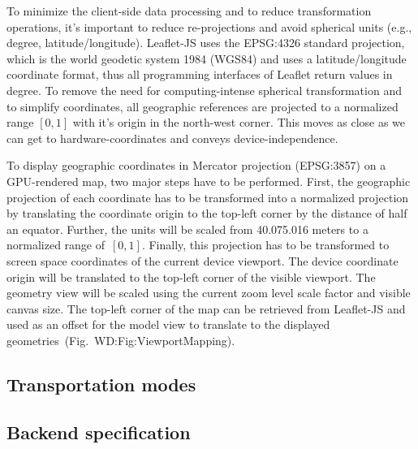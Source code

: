       To minimize the client-side data processing and to reduce transformation operations,
      it's important to reduce re-projections and avoid spherical units (e.g., degree,
      latitude/longitude). Leaflet-JS uses the EPSG:4326 standard projection, which is
      the world geodetic system 1984 (WGS84) and uses a latitude/longitude coordinate
      format, thus all programming interfaces of Leaflet return values in degree.
      To remove the need for computing-intense spherical transformation and to simplify
      coordinates, all geographic references are projected to a normalized range $[0, 1]$
      with it's origin in the north-west corner. This moves as close as we can get to
      hardware-coordinates and conveys device-independence.\par
      To dis\-play geographic coordinates in Mercator projection (EPSG:3857) on a GPU-rendered
      map, two major steps have to be performed. First, the geographic projection of
      each coordinate has to be transformed into a normalized projection by translating
      the coordinate origin to the top-left corner by the distance of half an equator.
      Further, the units will be scaled from 40.075.016 meters to a normalized range
      of~$[0,1]$. Finally, this projection has to be transformed to screen space coordinates
      of the current device viewport.  The device coordinate origin will be translated
      to the top-left corner of the visible viewport. The geometry view will be scaled
      using the current zoom level scale factor and visible canvas size. The top-left
      corner of the map can be retrieved from Leaflet-JS and used as an offset for
      the model view to translate to the displayed geometries~(Fig.~{WD:Fig:ViewportMapping}).
    \subsection{Transportation modes}
    \subsection{Backend specification}
    \label{sec:conc:back}
